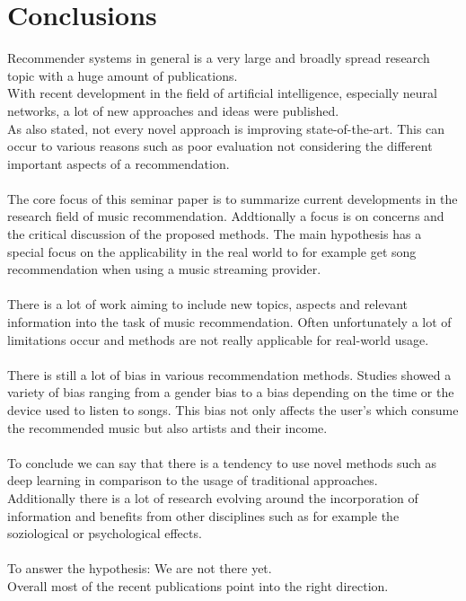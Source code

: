 \documentclass[runningheads,a4paper]{llncs}
\begin{document}
\section{Conclusions}
Recommender systems in general is a very large and broadly spread research topic with a huge amount of publications.\\
With recent development in the field of artificial intelligence, especially neural networks, a lot of new approaches and ideas were published.\\
As also \cite{cremonesi2021progress} stated, not every novel approach is improving state-of-the-art. This can occur to various reasons such as poor evaluation not considering the different important aspects of a recommendation.\\
\\
The core focus of this seminar paper is to summarize current developments in the research field of music recommendation. 
Addtionally a focus is on concerns and the critical discussion of the proposed methods. The main hypothesis has a special focus on the 
applicability in the real world to for example get song recommendation when using a music streaming provider.\\
\\
There is a lot of work aiming to include new topics, aspects and relevant information into the task of music recommendation. 
Often unfortunately a lot of limitations occur and methods are not really applicable for real-world usage. \\
\\
There is still a lot of bias in various recommendation methods. Studies showed a variety of bias ranging from a gender bias to a bias depending on the time or the device used to listen to songs. This bias not only 
affects the user's which consume the recommended music but also artists and their income. \\
\\
To conclude we can say that there is a tendency to use novel methods such as deep learning in comparison to the usage of traditional approaches.\\
Additionally there is a lot of research evolving around the incorporation of information and benefits from other disciplines such as 
for example the soziological or psychological effects. \\
\\
To answer the hypothesis: We are not there yet. \\
Overall most of the recent publications point into the right direction.  
\end{document}
